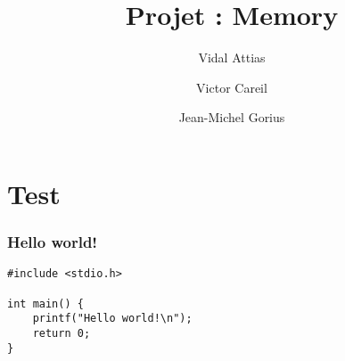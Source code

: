 \documentclass[info]{ensrennesbeamer}
\title[SECU: Projet]{Projet : Memory}
\author[V. Attias\and V. Careil\and J-M. Gorius]{Vidal Attias\and Victor Careil\and Jean-Michel Gorius}
\institute[]{ENS Rennes}
\date{\displaydate{date}}
\begin{document}
{
\begin{frame}[plain]
\titlepage
\end{frame}
}

\section{Test}

\begin{frame}[fragile]
\frametitle{Hello world!}
\begin{mdframed}[roundcorner=10pt,backgroundcolor=black!5!white]
\begin{verbatim}
#include <stdio.h>

int main() {
	printf("Hello world!\n");
	return 0;
}
\end{verbatim}
\end{mdframed}
\end{frame}
\end{document}

